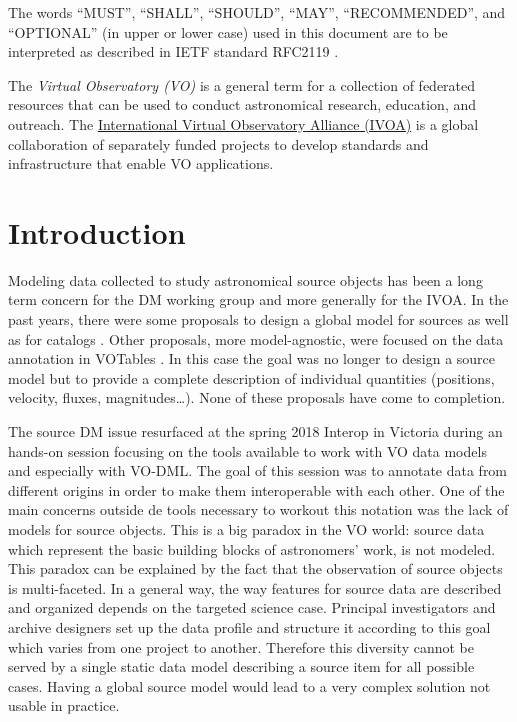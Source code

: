 \documentclass[11pt,a4paper]{ivoa}
\begin{document}
The words ``MUST'', ``SHALL'', ``SHOULD'', ``MAY'', ``RECOMMENDED'', and
``OPTIONAL'' (in upper or lower case) used in this document are to be
interpreted as described in IETF standard RFC2119 \citep{std:RFC2119}.

The \emph{Virtual Observatory (VO)} is a
general term for a collection of federated resources that can be used
to conduct astronomical research, education, and outreach.
The \href{http://www.ivoa.net}{International
Virtual Observatory Alliance (IVOA)} is a global
collaboration of separately funded projects to develop standards and
infrastructure that enable VO applications.


\section{Introduction}

Modeling data collected to study astronomical source objects has been a long term concern for the DM working group and more generally for the IVOA.
In the past years, there were some proposals to design a global model for sources \citep{wd:jesusdm} as well as for catalogs \citep{wd:catalog}.
Other proposals, more model-agnostic, were focused on the data annotation in VOTables \citep{note:stcvot} \citep{note:seb}. In this case the goal was no longer to design a source model but to provide a complete description of  individual quantities (positions, velocity, fluxes, magnitudes…).
None of these proposals have come to completion.

The source DM issue resurfaced at the spring 2018 Interop in Victoria during an hands-on session focusing on the tools available to work with VO data models and especially with VO-DML. The goal of this session was to annotate data from different origins in order to make them interoperable with each other.
One of the main concerns outside de tools necessary to workout this notation was the lack of models for source objects.
This is a big paradox in the VO world: source data which represent the basic building blocks of astronomers' work, is not modeled. This paradox can be explained by the fact that the observation of source objects is multi-faceted.
In a general way, the way features for source data are described and organized depends on the targeted science case. Principal investigators and archive designers set up the data profile and structure it according to this goal which varies from one project to another. Therefore this diversity cannot be served by a single static data model describing a source item for all possible cases.
Having a global source model would lead to a very complex solution not usable in practice.
\end{document}
